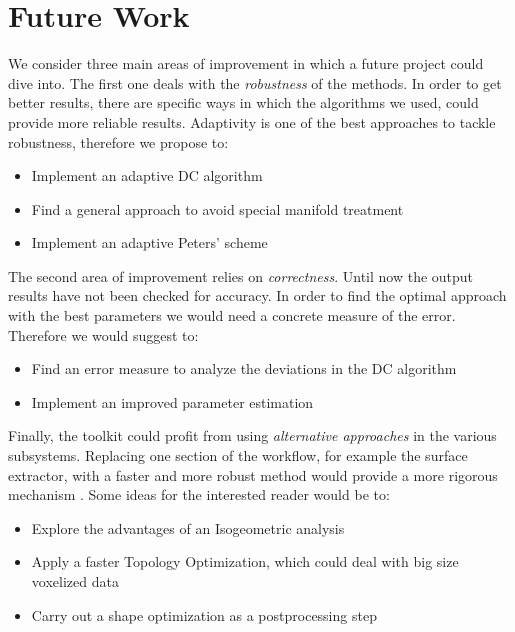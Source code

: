 \section{Future Work}
\label{sec:Future}
We consider three main areas of improvement in which a future project could dive into. The first one deals with the \textit{robustness} of the methods.  In order to get better results, there are specific ways in which the algorithms we used, could provide more reliable results. Adaptivity is one of the best approaches to tackle robustness, therefore we propose to:  
\begin{itemize}
\item Implement an adaptive DC algorithm
\item Find a general approach to  avoid special manifold treatment
\item Implement an adaptive Peters' scheme
\end{itemize}
The second area of improvement relies on \textit{correctness}. Until now the output results have not been checked for accuracy. In order to find the optimal approach with the best parameters we would need a concrete measure of the error. Therefore we would suggest to:
\begin{itemize}
\item Find an error measure to analyze the deviations in the DC algorithm
\item Implement an improved parameter estimation %
\end{itemize}
Finally, the toolkit could profit from using \textit{alternative approaches} in the various subsystems. Replacing one section of the workflow, for example the surface extractor, with a faster and more robust method would provide a more rigorous mechanism . Some ideas for the interested reader would be to:
\begin{itemize}
\item Explore the advantages of an Isogeometric analysis

\item Apply a faster Topology Optimization, which could deal with big size voxelized data

\item Carry out a shape optimization as a postprocessing step
\end{itemize}
